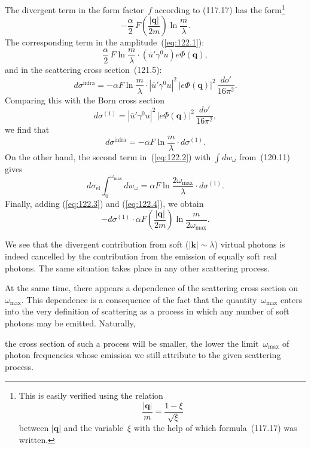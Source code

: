 The divergent term in the form factor~$f$ according to (117.17) has the form\footnote{This is easily verified using the relation
\[
\frac{|\mathbf{q}|}{m} = \frac{1-\xi}{\sqrt{\xi}}
\]
between $|\mathbf{q}|$ and the variable~$\xi$ with the help of which formula~(117.17) was written.}
\[
-\frac{\alpha}{2}\,F\!\left(\frac{|\mathbf{q}|}{2m}\right)\ln\frac{m}{\lambda}.
\]
The corresponding term in the amplitude~(\ref{eq:122.1}):
\[
\frac{\alpha}{2}\,F\ln\frac{m}{\lambda}\cdot(\bar{u}'\gamma^0 u)e\Phi(\mathbf{q}),
\]
and in the scattering cross section~(121.5):
\[
d\sigma^{\text{infra}} = -\alpha F\ln\frac{m}{\lambda}\cdot|\bar{u}'\gamma^0 u|^2\,|e\Phi(\mathbf{q})|^2\,\frac{do'}{16\pi^2}.
\]
Comparing this with the Born cross section
\[
d\sigma^{(1)} = |\bar{u}'\gamma^0 u|^2\,|e\Phi(\mathbf{q})|^2\,\frac{do'}{16\pi^2},
\]
we find that
\begin{equation}
d\sigma^{\text{infra}} = -\alpha F\ln\frac{m}{\lambda}\cdot d\sigma^{(1)}.
\label{eq:122.3}
\end{equation}
On the other hand, the second term in~(\ref{eq:122.2}) with $\int dw_\omega$ from~(120.11) gives
\begin{equation}
d\sigma_{\text{el}}\int_0^{\omega_{\max}}dw_\omega = \alpha F\ln\frac{2\omega_{\max}}{\lambda}\cdot d\sigma^{(1)}.
\label{eq:122.4}
\end{equation}
Finally, adding (\ref{eq:122.3}) and (\ref{eq:122.4}), we obtain
\begin{equation}
-d\sigma^{(1)}\cdot\alpha F\!\left(\frac{|\mathbf{q}|}{2m}\right)\ln\frac{m}{2\omega_{\max}}.
\label{eq:122.5}
\end{equation}

We see that the divergent contribution from soft ($|\mathbf{k}|\sim\lambda$) virtual photons is indeed cancelled by the contribution from the emission of equally soft real photons. The same situation takes place in any other scattering process.

At the same time, there appears a dependence of the scattering cross section on~$\omega_{\max}$. This dependence is a consequence of the fact that the quantity~$\omega_{\max}$ enters into the very definition of scattering as a process in which any number of soft photons may be emitted. Naturally,


\noindent the cross section of such a process will be smaller, the lower the limit~$\omega_{\max}$ of photon frequencies whose emission we still attribute to the given scattering process.

